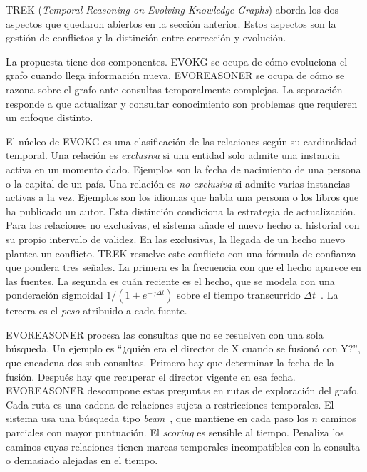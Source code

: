 TREK (\emph{Temporal Reasoning on Evolving Knowledge Graphs}) \cite{trek2025} aborda los dos aspectos que quedaron abiertos en la sección anterior. Estos aspectos son la gestión de conflictos y la distinción entre corrección y evolución.

La propuesta tiene dos componentes. EVOKG \cite{trek2025} se ocupa de cómo evoluciona el grafo cuando llega información nueva. EVOREASONER \cite{trek2025} se ocupa de cómo se razona sobre el grafo ante consultas temporalmente complejas. La separación responde a que actualizar y consultar conocimiento son problemas que requieren un enfoque distinto.

El núcleo de EVOKG es una clasificación de las relaciones según su cardinalidad temporal. Una relación es \emph{exclusiva} si una entidad solo admite una instancia activa en un momento dado. Ejemplos son la fecha de nacimiento de una persona o la capital de un país. Una relación es \emph{no exclusiva} si admite varias instancias activas a la vez. Ejemplos son los idiomas que habla una persona o los libros que ha publicado un autor. Esta distinción condiciona la estrategia de actualización. Para las relaciones no exclusivas, el sistema añade el nuevo hecho al historial con su propio intervalo de validez. En las exclusivas, la llegada de un hecho nuevo plantea un conflicto. TREK resuelve este conflicto con una fórmula de confianza que pondera tres señales. La primera es la frecuencia con que el hecho aparece en las fuentes. La segunda es cuán reciente es el hecho, que se modela con una ponderación sigmoidal $1/(1+e^{-\gamma \Delta t})$ sobre el tiempo transcurrido $\Delta t$~\cite{trek2025}. La tercera es el \emph{peso} atribuido a cada fuente.

EVOREASONER procesa las consultas que no se resuelven con una sola búsqueda. Un ejemplo es ``¿quién era el director de X cuando se fusionó con Y?'', que encadena dos sub-consultas. Primero hay que determinar la fecha de la fusión. Después hay que recuperar el director vigente en esa fecha. EVOREASONER descompone estas preguntas en rutas de exploración del grafo. Cada ruta es una cadena de relaciones sujeta a restricciones temporales. El sistema usa una búsqueda tipo \emph{beam}~\cite{lowerre1976harpy}, que mantiene en cada paso los $n$ caminos parciales con mayor puntuación. El \emph{scoring} es sensible al tiempo. Penaliza los caminos cuyas relaciones tienen marcas temporales incompatibles con la consulta o demasiado alejadas en el tiempo.

